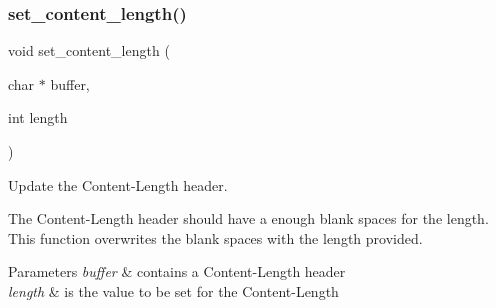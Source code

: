 \subsubsection{\texorpdfstring{set\+\_\+content\+\_\+length()}{set\_content\_length()}}
{\footnotesize\ttfamily void set\+\_\+content\+\_\+length (\begin{DoxyParamCaption}\item[{char $\ast$}]{buffer,  }\item[{int}]{length }\end{DoxyParamCaption})}



Update the Content-\/\+Length header. 

The Content-\/\+Length header should have a enough blank spaces for the length. This function overwrites the blank spaces with the length provided. 
\begin{DoxyParams}{Parameters}
{\em buffer} & contains a Content-\/\+Length header \\
\hline
{\em length} & is the value to be set for the Content-\/\+Length \\
\hline
\end{DoxyParams}
